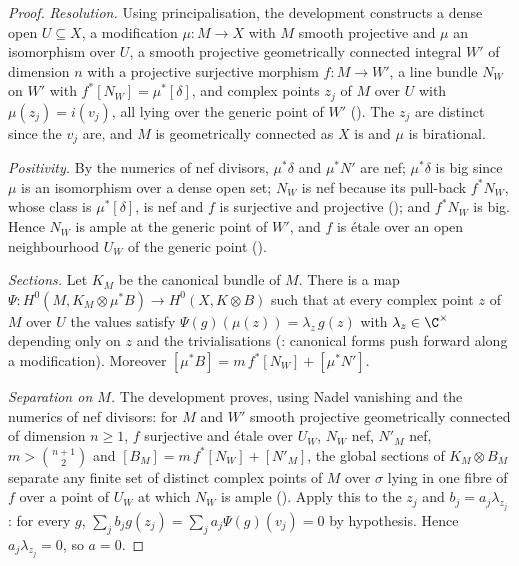 \begin{proof}
\emph{Resolution.} Using principalisation, the development constructs a dense open $U\subseteq X$, a
modification $\mu\colon M\to X$ with $M$ smooth projective and $\mu$ an isomorphism over $U$, a smooth
projective geometrically connected integral $W'$ of dimension $n$ with a projective surjective morphism
$f\colon M\to W'$, a line bundle $N_W$ on $W'$ with $f^*[N_W]=\mu^*[\delta]$, and complex points $z_j$ of $M$
over $U$ with $\mu(z_j)=i(v_j)$, all lying over the generic point of $W'$
(). The $z_j$ are distinct since the $v_j$ are, and $M$ is
geometrically connected as $X$ is and $\mu$ is birational.

\emph{Positivity.} By the numerics of nef divisors, $\mu^*\delta$ and $\mu^*N'$ are nef; $\mu^*\delta$ is big
since $\mu$ is an isomorphism over a dense open set; $N_W$ is nef because its pull-back $f^*N_W$, whose
class is $\mu^*[\delta]$, is nef and $f$ is surjective and projective
(); and $f^*N_W$ is big. Hence
$N_W$ is ample at the generic point of $W'$, and $f$ is \'etale over an open neighbourhood $U_W$ of the
generic point ().

\emph{Sections.} Let $K_M$ be the canonical bundle of $M$. There is a map
$\Psi\colon H^0(M,K_M\otimes\mu^*B)\to H^0(X,K\otimes B)$ such that at every complex point $z$ of $M$ over $U$
the values satisfy $\Psi(g)(\mu(z))=\lambda_z\,g(z)$ with $\lambda_z\in\C^\times$ depending only on $z$ and
the trivialisations (: canonical
forms push forward along a modification). Moreover
$[\mu^*B]=m\,f^*[N_W]+[\mu^*N']$.

\emph{Separation on $M$.} The development proves, using Nadel vanishing and the numerics of nef
divisors: for $M$ and $W'$ smooth projective geometrically connected of dimension $n\ge1$, $f$ surjective
and \'etale over $U_W$, $N_W$ nef, $N'_M$ nef, $m>\binom{n+1}2$ and $[B_M]=m\,f^*[N_W]+[N'_M]$, the global
sections of $K_M\otimes B_M$ separate any finite set of distinct complex points of $M$ over $\sigma$ lying in
one fibre of $f$ over a point of $U_W$ at which $N_W$ is ample
(). Apply this to the $z_j$ and
$b_j=a_j\lambda_{z_j}$: for every $g$,
$\sum_jb_jg(z_j)=\sum_ja_j\Psi(g)(v_j)=0$ by hypothesis. Hence $a_j\lambda_{z_j}=0$, so $a=0$.
\end{proof}

